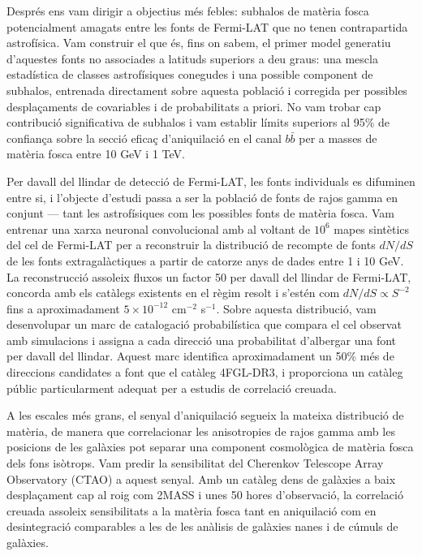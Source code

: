 \begin{otherlanguage}{catalan}
Després ens vam dirigir a objectius més febles: subhalos de matèria fosca potencialment amagats entre les fonts de Fermi-LAT que no tenen contrapartida astrofísica. Vam construir el que és, fins on sabem, el primer model generatiu d'aquestes fonts no associades a latituds superiors a deu graus: una mescla estadística de classes astrofísiques conegudes i una possible component de subhalos, entrenada directament sobre aquesta població i corregida per possibles desplaçaments de covariables i de probabilitats a priori.
No vam trobar cap contribució significativa de subhalos i vam establir límits superiors al 95\% de confiança sobre la secció eficaç d'aniquilació en el canal $b\bar{b}$ per a masses de matèria fosca entre 10 GeV i 1 TeV.

Per davall del llindar de detecció de Fermi-LAT, les fonts individuals es difuminen entre si, i l'objecte d'estudi passa a ser la població de fonts de rajos gamma en conjunt --- tant les astrofísiques com les possibles fonts de matèria fosca. Vam entrenar una xarxa neuronal convolucional amb al voltant de $10^6$ mapes sintètics del cel de Fermi-LAT per a reconstruir la distribució de recompte de fonts $dN/dS$ de les fonts extragalàctiques a partir de catorze anys de dades entre 1 i 10 GeV. La reconstrucció assoleix fluxos un factor 50 per davall del llindar de Fermi-LAT, concorda amb els catàlegs existents en el règim resolt i s'estén com $dN/dS \propto S^{-2}$ fins a aproximadament $5\times10^{-12}$ cm$^{-2}$ s$^{-1}$.
Sobre aquesta distribució, vam desenvolupar un marc de catalogació probabilística que compara el cel observat amb simulacions i assigna a cada direcció una probabilitat d'albergar una font per davall del llindar. Aquest marc identifica aproximadament un 50\% més de direccions candidates a font que el catàleg 4FGL-DR3, i proporciona un catàleg públic particularment adequat per a estudis de correlació creuada.

A les escales més grans, el senyal d'aniquilació segueix la mateixa distribució de matèria, de manera que correlacionar les anisotropies de rajos gamma amb les posicions de les galàxies pot separar una component cosmològica de matèria fosca dels fons isòtrops. Vam predir la sensibilitat del Cherenkov Telescope Array Observatory (CTAO) a aquest senyal. Amb un catàleg dens de galàxies a baix desplaçament cap al roig com 2MASS i unes 50 hores d'observació, la correlació creuada assoleix sensibilitats a la matèria fosca tant en aniquilació com en desintegració comparables a les de les anàlisis de galàxies nanes i de cúmuls de galàxies.


\end{otherlanguage}
